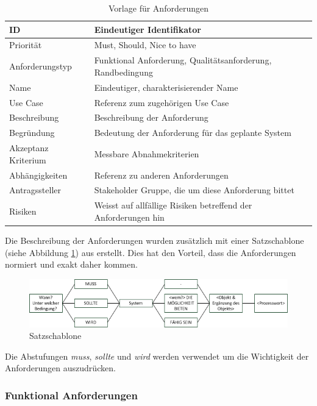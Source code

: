\begin{table}[ht]
\centering
  \begin{tabular}{ l | p{8cm} }
	\hline
	\rowcolor{gray}
	ID 			&	Eindeutiger Identifikator\\ \hline
	Priorität 		&	Must, Should, Nice to have\\ \hline
	Anforderungstyp	&	Funktional Anforderung, Qualitätsanforderung, Randbedingung\\ \hline
	Name 			&	Eindeutiger, charakterisierender Name\\ \hline
	Use Case 		&	Referenz zum zugehörigen Use Case\\ \hline
	Beschreibung 	&	Beschreibung der Anforderung\\ \hline
	Begründung 		&	Bedeutung der Anforderung für das geplante System\\ \hline
	Akzeptanz Kriterium	&	Messbare Abnahmekriterien\\ \hline
	Abhängigkeiten 	&	Referenz zu anderen Anforderungen\\ \hline
	Antragssteller 	&	Stakeholder Gruppe, die um diese Anforderung bittet\\ \hline
	Risiken	 	&	Weisst auf allfällige Risiken betreffend der Anforderungen hin
  \end{tabular}
   \caption{Vorlage für Anforderungen}\label{table:req_template}
\end{table}


Die Beschreibung der Anforderungen wurden zusätzlich mit einer Satzschablone (siehe Abbildung \ref{fig:satzschablone}) aus \cite{req_eng_book} erstellt. Dies hat den Vorteil, dass die Anforderungen normiert und exakt daher kommen.
\begin{figure}[h]
\includegraphics{images/anforderungen/satzschablone.png}
\caption{Satzschablone}
\label{fig:satzschablone}
\end{figure}
\FloatBarrier
Die Abstufungen \emph{muss}, \emph{sollte} und \emph{wird} werden verwendet um die Wichtigkeit der Anforderungen auszudrücken.

\newpage
\FloatBarrier
\subsubsection{Funktional Anforderungen}\label{func_anforderungen}

